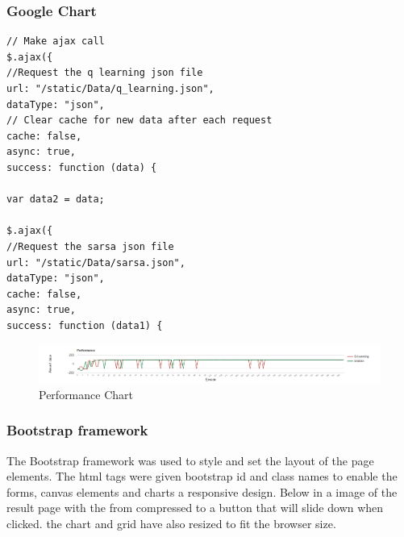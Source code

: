 \subsubsection{Google Chart}
\begin{verbatim}
// Make ajax call
$.ajax({
//Request the q learning json file
url: "/static/Data/q_learning.json",
dataType: "json",
// Clear cache for new data after each request
cache: false,
async: true,
success: function (data) {

var data2 = data;

$.ajax({
//Request the sarsa json file
url: "/static/Data/sarsa.json",
dataType: "json",
cache: false,
async: true,
success: function (data1) {
\end{verbatim}
\begin{figure}[H]
	\centering
	\includegraphics[width=1\linewidth]{img/performance}
	\caption{Performance Chart}
	\label{fig:performance}
\end{figure}
\subsubsection{Bootstrap framework}
The Bootstrap framework was used to style and set the layout of the page elements.
The html tags were given bootstrap id and class names to enable the forms, canvas elements and charts a responsive design. Below in a image of the result page with the from compressed to a button that will slide down when clicked. the chart and grid have also resized to fit the browser size.

